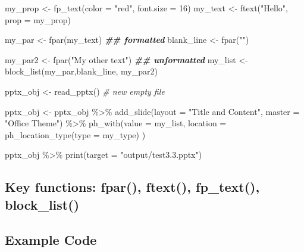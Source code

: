 \documentclass[
]{book}
\newenvironment{Shaded}{\begin{snugshade}}{\end{snugshade}}
\newcommand{\AttributeTok}[1]{\textcolor[rgb]{0.77,0.63,0.00}{#1}}
\newcommand{\CommentTok}[1]{\textcolor[rgb]{0.56,0.35,0.01}{\textit{#1}}}
\newcommand{\DecValTok}[1]{\textcolor[rgb]{0.00,0.00,0.81}{#1}}
\newcommand{\DocumentationTok}[1]{\textcolor[rgb]{0.56,0.35,0.01}{\textbf{\textit{#1}}}}
\newcommand{\FunctionTok}[1]{\textcolor[rgb]{0.00,0.00,0.00}{#1}}
\newcommand{\NormalTok}[1]{#1}
\newcommand{\OtherTok}[1]{\textcolor[rgb]{0.56,0.35,0.01}{#1}}
\newcommand{\SpecialCharTok}[1]{\textcolor[rgb]{0.00,0.00,0.00}{#1}}
\newcommand{\StringTok}[1]{\textcolor[rgb]{0.31,0.60,0.02}{#1}}
\begin{document}
\begin{Shaded}
\begin{Highlighting}[]
\NormalTok{my\_prop }\OtherTok{\textless{}{-}} \FunctionTok{fp\_text}\NormalTok{(}\AttributeTok{color =} \StringTok{"red"}\NormalTok{, }\AttributeTok{font.size =} \DecValTok{16}\NormalTok{)}
\NormalTok{my\_text }\OtherTok{\textless{}{-}} \FunctionTok{ftext}\NormalTok{(}\StringTok{"Hello"}\NormalTok{, }\AttributeTok{prop =}\NormalTok{ my\_prop)}

\NormalTok{my\_par }\OtherTok{\textless{}{-}} \FunctionTok{fpar}\NormalTok{(my\_text) }\DocumentationTok{\#\# formatted}
\NormalTok{blank\_line }\OtherTok{\textless{}{-}} \FunctionTok{fpar}\NormalTok{(}\StringTok{""}\NormalTok{)}

\NormalTok{my\_par2 }\OtherTok{\textless{}{-}} \FunctionTok{fpar}\NormalTok{(}\StringTok{"My other text"}\NormalTok{) }\DocumentationTok{\#\# unformatted}
\NormalTok{my\_list }\OtherTok{\textless{}{-}} \FunctionTok{block\_list}\NormalTok{(my\_par,blank\_line, my\_par2)}

\NormalTok{pptx\_obj }\OtherTok{\textless{}{-}} \FunctionTok{read\_pptx}\NormalTok{() }\CommentTok{\# new empty file}

\NormalTok{pptx\_obj }\OtherTok{\textless{}{-}}\NormalTok{ pptx\_obj }\SpecialCharTok{\%\textgreater{}\%}
  \FunctionTok{add\_slide}\NormalTok{(}\AttributeTok{layout =} \StringTok{"Title and Content"}\NormalTok{, }\AttributeTok{master =} \StringTok{"Office Theme"}\NormalTok{) }\SpecialCharTok{\%\textgreater{}\%} 
  \FunctionTok{ph\_with}\NormalTok{(}\AttributeTok{value =}\NormalTok{ my\_list, }\AttributeTok{location =} \FunctionTok{ph\_location\_type}\NormalTok{(}\AttributeTok{type =}\NormalTok{ my\_type) )}

\NormalTok{pptx\_obj }\SpecialCharTok{\%\textgreater{}\%}
  \FunctionTok{print}\NormalTok{(}\AttributeTok{target =} \StringTok{"output/test3.3.pptx"}\NormalTok{) }
\end{Highlighting}
\end{Shaded}

\hypertarget{key-functions-fpar-ftext-fp_text-block_list}{%
\subsection{Key functions: fpar(), ftext(), fp\_text(), block\_list()}\label{key-functions-fpar-ftext-fp_text-block_list}}

\hypertarget{example-code-1}{%
\subsection{Example Code}\label{example-code-1}}
\end{document}
